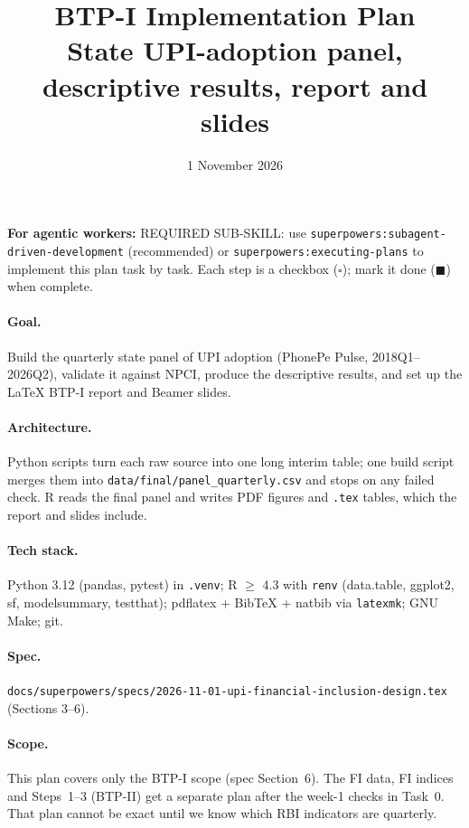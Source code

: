 \documentclass[10pt,a4paper]{article}
\title{BTP-I Implementation Plan\\[2pt]\large State UPI-adoption panel, descriptive results, report and slides}
\date{1 November 2026}
\newcommand{\f}[1]{\texttt{#1}}
\begin{document}
\maketitle

\noindent\textbf{For agentic workers:} REQUIRED SUB-SKILL: use \f{superpowers:subagent-driven-development}
(recommended) or \f{superpowers:executing-plans} to implement this plan task by task. Each step is a
checkbox ($\square$); mark it done ($\blacksquare$) when complete.

\paragraph{Goal.} Build the quarterly state panel of UPI adoption (PhonePe Pulse, 2018Q1--2026Q2), validate it
against NPCI, produce the descriptive results, and set up the \LaTeX{} BTP-I report and Beamer slides.

\paragraph{Architecture.} Python scripts turn each raw source into one long interim table; one build script
merges them into \f{data/final/panel\_quarterly.csv} and stops on any failed check. R reads the final
panel and writes PDF figures and \f{.tex} tables, which the report and slides include.

\paragraph{Tech stack.} Python 3.12 (pandas, pytest) in \f{.venv}; R $\geq$ 4.3 with \f{renv}
(data.table, ggplot2, sf, modelsummary, testthat); pdflatex + BibTeX + natbib via \f{latexmk}; GNU Make; git.

\paragraph{Spec.} \f{docs/superpowers/specs/2026-11-01-upi-financial-inclusion-design.tex} (Sections 3--6).

\paragraph{Scope.} This plan covers only the BTP-I scope (spec Section~6). The FI data, FI indices and
Steps~1--3 (BTP-II) get a separate plan after the week-1 checks in Task~0. That plan cannot be exact until
we know which RBI indicators are quarterly.
\end{document}

